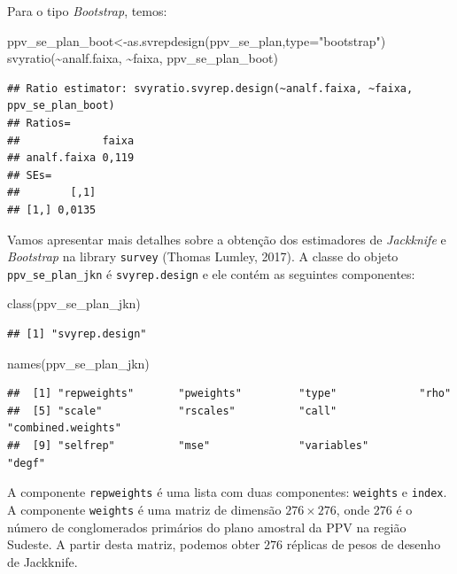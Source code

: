 \documentclass[
  12pt,
  brazilian,
]{book}
\newenvironment{Shaded}{\begin{snugshade}}{\end{snugshade}}
\newcommand{\AttributeTok}[1]{\textcolor[rgb]{0.77,0.63,0.00}{#1}}
\newcommand{\FunctionTok}[1]{\textcolor[rgb]{0.00,0.00,0.00}{#1}}
\newcommand{\NormalTok}[1]{#1}
\newcommand{\OtherTok}[1]{\textcolor[rgb]{0.56,0.35,0.01}{#1}}
\newcommand{\SpecialCharTok}[1]{\textcolor[rgb]{0.00,0.00,0.00}{#1}}
\newcommand{\StringTok}[1]{\textcolor[rgb]{0.31,0.60,0.02}{#1}}
\theoremstyle{definition}
\theoremstyle{definition}
\theoremstyle{definition}
\theoremstyle{definition}
\theoremstyle{remark}
\begin{document}
Para o tipo \emph{Bootstrap}, temos:

\begin{Shaded}
\begin{Highlighting}[]
\NormalTok{ppv\_se\_plan\_boot}\OtherTok{\textless{}{-}}\FunctionTok{as.svrepdesign}\NormalTok{(ppv\_se\_plan,}\AttributeTok{type=}\StringTok{"bootstrap"}\NormalTok{)}
\FunctionTok{svyratio}\NormalTok{(}\SpecialCharTok{\textasciitilde{}}\NormalTok{analf.faixa, }\SpecialCharTok{\textasciitilde{}}\NormalTok{faixa, ppv\_se\_plan\_boot)}
\end{Highlighting}
\end{Shaded}

\begin{verbatim}
## Ratio estimator: svyratio.svyrep.design(~analf.faixa, ~faixa, ppv_se_plan_boot)
## Ratios=
##             faixa
## analf.faixa 0,119
## SEs=
##        [,1]
## [1,] 0,0135
\end{verbatim}

Vamos apresentar mais detalhes sobre a obtenção dos estimadores de \emph{Jackknife} e \emph{Bootstrap} na library \texttt{survey} (Thomas Lumley, 2017).
A classe do objeto \texttt{ppv\_se\_plan\_jkn} é \texttt{svyrep.design} e ele contém as seguintes componentes:

\begin{Shaded}
\begin{Highlighting}[]
\FunctionTok{class}\NormalTok{(ppv\_se\_plan\_jkn)}
\end{Highlighting}
\end{Shaded}

\begin{verbatim}
## [1] "svyrep.design"
\end{verbatim}

\begin{Shaded}
\begin{Highlighting}[]
\FunctionTok{names}\NormalTok{(ppv\_se\_plan\_jkn)}
\end{Highlighting}
\end{Shaded}

\begin{verbatim}
##  [1] "repweights"       "pweights"         "type"             "rho"             
##  [5] "scale"            "rscales"          "call"             "combined.weights"
##  [9] "selfrep"          "mse"              "variables"        "degf"
\end{verbatim}

A componente \texttt{repweights} é uma lista com duas componentes: \texttt{weights} e \texttt{index}. A componente
\texttt{weights} é uma matriz de dimensão \(276 \times 276\), onde \(276\) é o número de conglomerados primários do plano
amostral da PPV na região Sudeste. A partir desta matriz, podemos obter \(276\) réplicas de pesos de desenho de Jackknife.
\end{document}
